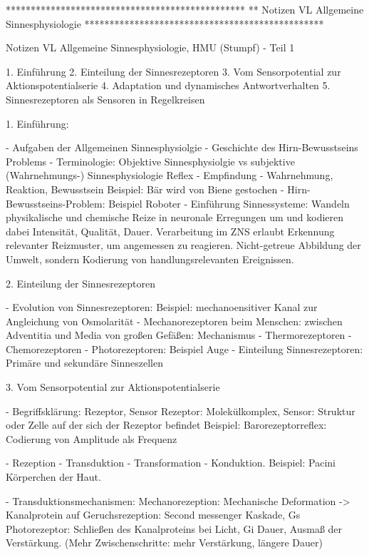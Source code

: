     
        


************************************************
** Notizen VL Allgemeine Sinnesphysiologie
************************************************

Notizen VL Allgemeine Sinnesphysiologie, HMU (Stumpf) - Teil 1

1. Einführung
2. Einteilung der Sinnesrezeptoren
3. Vom Sensorpotential zur Aktionspotentialserie
4. Adaptation und dynamisches Antwortverhalten
5. Sinnesrezeptoren als Sensoren in Regelkreisen


1. Einführung: 

- Aufgaben der Allgemeinen Sinnesphysiolgie
- Geschichte des Hirn-Bewusstseins Problems
- Terminologie: Objektive Sinnesphysiolgie vs subjektive (Wahrnehmungs-) Sinnesphysiologie
    Reflex - Empfindung - Wahrnehmung, Reaktion, Bewusstsein
    Beispiel: Bär wird von Biene gestochen
- Hirn-Bewusstseins-Problem: Beispiel Roboter
- Einführung Sinnessysteme: 
    Wandeln physikalische und chemische Reize in neuronale Erregungen um und kodieren dabei Intensität, Qualität, Dauer. 
    Verarbeitung im ZNS erlaubt Erkennung relevanter Reizmuster, um angemessen zu reagieren. 
    Nicht-getreue Abbildung der Umwelt, sondern Kodierung von handlungsrelevanten Ereignissen. 
  
    
2. Einteilung der Sinnesrezeptoren

- Evolution von Sinnesrezeptoren: 
    Beispiel: mechanoensitiver Kanal zur Angleichung von Osmolarität
- Mechanorezeptoren beim Menschen: zwischen Adventitia und Media von großen Gefäßen: Mechanismus
- Thermorezeptoren
- Chemorezeptoren
- Photorezeptoren: Beispiel Auge
- Einteilung Sinnesrezeptoren: Primäre und sekundäre Sinneszellen

3. Vom Sensorpotential zur Aktionspotentialserie

- Begriffsklärung: Rezeptor, Sensor
    Rezeptor: Molekülkomplex, Sensor: Struktur oder Zelle auf der sich der Rezeptor befindet
    Beispiel: Barorezeptorreflex: Codierung von Amplitude als Frequenz

- Rezeption - Transduktion - Transformation - Konduktion. Beispiel: Pacini Körperchen der Haut. 

- Transduktionsmechanismen:
    Mechanorezeption: Mechanische Deformation -> Kanalprotein auf
    Geruchsrezeption: Second messenger Kaskade, Gs
    Photorezeptor: Schließen des Kanalproteins bei Licht, Gi
    Dauer, Ausmaß der Verstärkung. (Mehr Zwischenschritte: mehr Verstärkung, längere Dauer)
    

